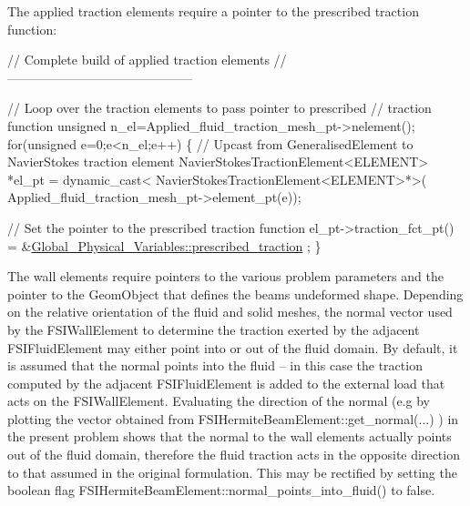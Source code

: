 The applied traction elements require a pointer to the prescribed traction function\+:


\begin{DoxyCodeInclude}

 \textcolor{comment}{// Complete build of applied traction elements}
 \textcolor{comment}{//--------------------------------------------}

 \textcolor{comment}{// Loop over the traction elements to pass pointer to prescribed }
 \textcolor{comment}{// traction function}
 \textcolor{keywordtype}{unsigned} n\_el=Applied\_fluid\_traction\_mesh\_pt->nelement();
 \textcolor{keywordflow}{for}(\textcolor{keywordtype}{unsigned} e=0;e<n\_el;e++)
  \{
   \textcolor{comment}{// Upcast from GeneralisedElement to NavierStokes traction element}
   NavierStokesTractionElement<ELEMENT> *el\_pt = 
    \textcolor{keyword}{dynamic\_cast<} NavierStokesTractionElement<ELEMENT>*\textcolor{keyword}{>}(
     Applied\_fluid\_traction\_mesh\_pt->element\_pt(e));
    
   \textcolor{comment}{// Set the pointer to the prescribed traction function}
   el\_pt->traction\_fct\_pt() = &\hyperlink{namespaceGlobal__Physical__Variables_a0de42ee6d39e85c77c16a04c3a05f7a2}{Global\_Physical\_Variables::prescribed\_traction}
      ;
  \}

\end{DoxyCodeInclude}


The wall elements require pointers to the various problem parameters and the pointer to the {\ttfamily Geom\+Object} that defines the beam\textquotesingle{}s undeformed shape. Depending on the relative orientation of the fluid and solid meshes, the normal vector used by the {\ttfamily F\+S\+I\+Wall\+Element} to determine the traction exerted by the adjacent {\ttfamily F\+S\+I\+Fluid\+Element} may either point into or out of the fluid domain. By default, it is assumed that the normal points into the fluid -- in this case the traction computed by the adjacent {\ttfamily F\+S\+I\+Fluid\+Element} is added to the external load that acts on the {\ttfamily F\+S\+I\+Wall\+Element}. Evaluating the direction of the normal (e.\+g by plotting the vector obtained from {\ttfamily F\+S\+I\+Hermite\+Beam\+Element\+::get\+\_\+normal}(...) ) in the present problem shows that the normal to the wall elements actually points out of the fluid domain, therefore the fluid traction acts in the opposite direction to that assumed in the original formulation. This may be rectified by setting the boolean flag {\ttfamily F\+S\+I\+Hermite\+Beam\+Element\+::normal\+\_\+points\+\_\+into\+\_\+fluid()} to {\ttfamily false}.


